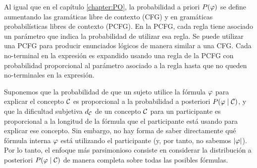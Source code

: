 Al igual que en el capítulo \ref{chapter:PO}, la probabilidad a priori $P(\varphi)$ se define aumentando las gramáticas libre de contexto (CFG) \grambool y \gramboolxor en gramáticas probabilísticas libres de contexto (PCFG). En la PCFG, cada regla tiene asociado un parámetro que indica la probabilidad de utilizar esa regla. Se puede utilizar una PCFG para producir enunciados lógicos de manera similar a una CFG. Cada no-terminal en la expresión es expandido usando una regla de la PCFG con probabilidad proporcional al parámetro asociado a la regla hasta que no queden no-terminales en la expresión.



Suponemos que la probabilidad de que un sujeto utilice la fórmula $\varphi$ para explicar el concepto $\mathcal{C}$ es proporcional a la probabilidad a posteriori $P(\varphi \mid \mathcal{C})$, y que la dificultad subjetiva $d_{\mathcal{C}}$ de un concepto $\mathcal{C}$ para un participante es proporcional a la longitud de la fórmula que el participante está usando para explicar ese concepto. Sin embargo, no hay forma de saber directamente qué fórmula interna $\varphi$ está utilizando el participante (y, por tanto, no sabemos $|\varphi|$). Por lo tanto, el enfoque más parsimonioso consiste en considerar la distribución a posteriori $P(\varphi \mid \mathcal{C})$ de manera completa sobre todas las posibles fórmulas.

